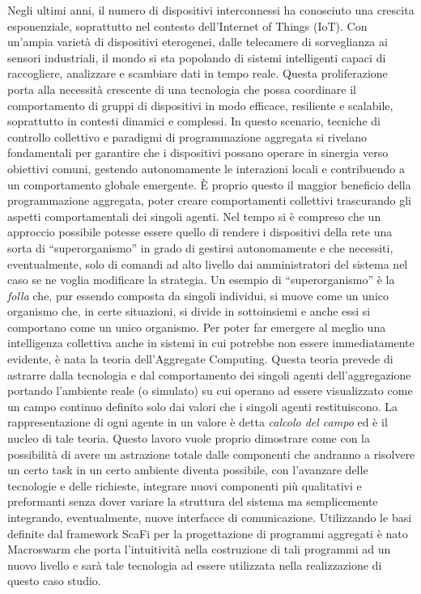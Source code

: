 \documentclass[12pt,a4paper,openright,twoside]{book}
\begin{document}
Negli ultimi anni, il numero di dispositivi interconnessi ha conosciuto una crescita esponenziale, soprattutto nel contesto dell'Internet of Things (IoT). Con un'ampia varietà di dispositivi eterogenei, dalle telecamere di sorveglianza ai sensori industriali, il mondo si sta popolando di sistemi intelligenti capaci di raccogliere, analizzare e scambiare dati in tempo reale. Questa proliferazione porta alla necessità crescente di una tecnologia che possa coordinare il comportamento di gruppi di dispositivi in modo efficace, resiliente e scalabile, soprattutto in contesti dinamici e complessi. In questo scenario, tecniche di controllo collettivo e paradigmi di programmazione aggregata si rivelano fondamentali per garantire che i dispositivi possano operare in sinergia verso obiettivi comuni, gestendo autonomamente le interazioni locali e contribuendo a un comportamento globale emergente. È proprio questo il maggior beneficio della programmazione aggregata, poter creare comportamenti collettivi trascurando gli aspetti comportamentali dei singoli agenti. 
Nel tempo si è compreso che un approccio possibile potesse essere quello di rendere i dispositivi della rete una sorta di ``superorganismo'' in grado di gestirsi autonomamente e che necessiti, eventualmente, solo di comandi ad alto livello dai amministratori del sistema nel caso se ne voglia modificare la strategia. Un esempio di ``superorganismo'' è la \textit{folla} che, pur essendo composta da singoli individui, si muove come un unico organismo che, in certe situazioni, si divide in sottoinsiemi e anche essi si comportano come un unico organismo. 
Per poter far emergere al meglio una intelligenza collettiva anche in sistemi in cui potrebbe non essere immediatamente evidente, è nata la teoria dell'Aggregate Computing. Questa teoria prevede di astrarre dalla tecnologia e dal comportamento dei singoli agenti dell'aggregazione portando l'ambiente reale (o simulato) su cui operano ad essere visualizzato come un campo continuo definito solo dai valori che i singoli agenti restituiscono. La rappresentazione di ogni agente in un valore è detta \textit{calcolo del campo} ed è il nucleo di tale teoria.
Questo lavoro vuole proprio dimostrare come con la possibilità di avere un astrazione totale dalle componenti che andranno a risolvere un certo task in un certo ambiente diventa possibile, con l'avanzare delle tecnologie e delle richieste, integrare nuovi componenti più qualitativi e preformanti senza dover variare la struttura del sistema ma semplicemente integrando, eventualmente, nuove interfacce di comunicazione. Utilizzando le basi definite dal framework ScaFi per la progettazione di programmi aggregati è nato Macroswarm che porta l'intuitività nella costruzione di tali programmi ad un nuovo livello e sarà tale tecnologia ad essere utilizzata nella realizzazione di questo caso studio. 
\end{document}
